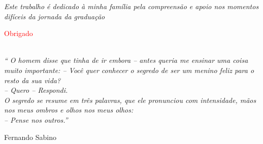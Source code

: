 \begin{dedicatoria}
	\vspace*{\fill}
	\centering
	\noindent
	\textit{Este trabalho é dedicado à minha família pela compreensão e apoio nos momentos difíceis da jornada da graduação} \vspace*{\fill}
\end{dedicatoria}

\begin{agradecimentos}
\textcolor{red}{Obrigado}
\end{agradecimentos}

\begin{epigrafe}
	\vspace*{\fill}
	\noindent
	\hangindent=5cm \\
 	\textit{`` O homem disse que tinha de ir embora -- antes queria me ensinar uma coisa muito importante: -- Você quer conhecer o segredo de ser um menino feliz para o resto da sua vida? \\ -- Quero -- Respondi. \\ O segredo se resume em três palavras, que ele pronunciou com intensidade, mãos nos meus ombros e olhos nos meus olhos: \\ -- Pense nos outros.''}
 	\begin{flushright}
	Fernando Sabino	
	\end{flushright}		
\end{epigrafe}


%
%
%
%
%

